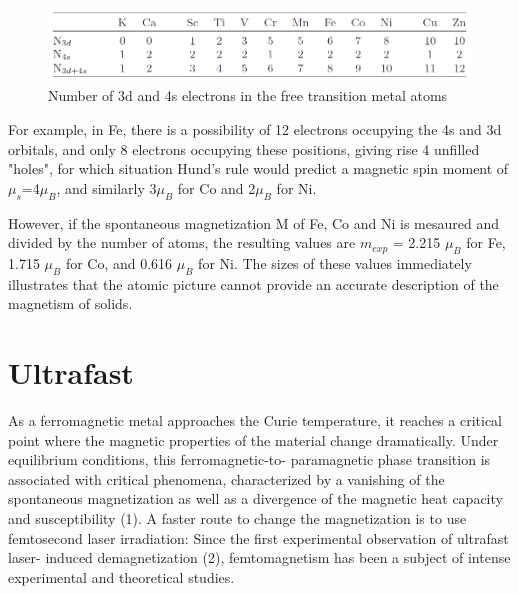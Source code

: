 \begin{figure}
	\begin{center}
		\includegraphics[width=150mm]{figs/TransitionMetalValenceShells}
	\end{center}
\caption{Number of 3d and 4s electrons in the free transition metal atoms}
\label{TransMetalUnpE}
\end{figure}

For example, in Fe, there is a possibility of 12 electrons occupying the 4s and 3d orbitals, and only 8 electrons occupying these positions, giving rise 4 unfilled "holes", for which situation Hund's rule would predict a magnetic spin moment of $\mu_s$=4$\mu_B$, and similarly 3$\mu_B$ for Co and 2$\mu_B$ for Ni.

However, if the spontaneous magnetization M of Fe, Co and Ni is mesaured and divided by the number of atoms, the resulting values are $m_{exp}$ = 2.215 $\mu_B$ for Fe, 1.715 $\mu_B$ for Co, and 0.616 $\mu_B$ for Ni. The sizes of these values immediately illustrates that the atomic picture cannot provide an accurate description of the magnetism of solids.

\section{Ultrafast}
As a ferromagnetic metal approaches the Curie temperature, it reaches a critical point where the magnetic properties of the material change dramatically. Under equilibrium conditions, this ferromagnetic-to- paramagnetic phase transition is associated with critical phenomena, characterized by a vanishing of the spontaneous magnetization as well as a divergence of the magnetic heat capacity and susceptibility (1). A faster route to change the magnetization is to use femtosecond laser irradiation: Since the first experimental observation of ultrafast laser- induced demagnetization (2), femtomagnetism has been a subject of intense experimental and theoretical studies.

